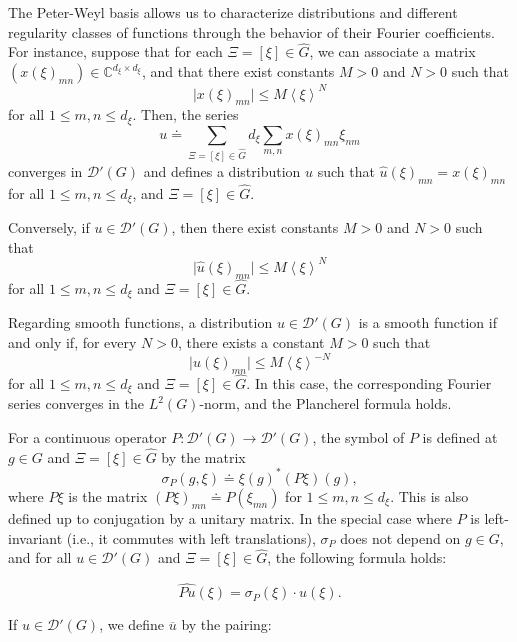 \documentclass[sn-mathphys-num]{sn-jnl}%
\numberwithin{equation}{section}
\theoremstyle{thmstyleone}
\theoremstyle{thmstyletwo}
\theoremstyle{thmstylethree}
\newcommand{\C}{\mathbb{C}}
\def\jp#1{{\left\langle{#1}\right\rangle}}
\begin{document}
The Peter-Weyl basis allows us to characterize distributions and different regularity classes of functions through the behavior of their Fourier coefficients. For instance, suppose that for each $\Xi = [\xi] \in \widehat{G}$, we can associate a matrix $(x(\xi)_{mn}) \in \C^{d_\xi \times d_\xi}$, and that there exist constants $M > 0$ and $N > 0$ such that
\begin{equation}\label{dist}
	\big|x(\xi)_{mn} \big| \leq M \jp{\xi}^{N}
\end{equation}
for all $1 \leq m,n \leq d_\xi$. Then, the series
$$
u \doteq \sum_{\Xi = [\xi] \in \widehat{G}} d_\xi \sum_{m,n} x(\xi)_{mn} \xi_{nm}
$$
converges in $\mathcal{D}'(G)$ and defines a distribution $u$ such that $\widehat{u}(\xi)_{mn} = x(\xi)_{mn}$ for all $1 \leq m,n \leq d_\xi$, and $\Xi = [\xi] \in \widehat{G}$.

Conversely, if $u \in \mathcal{D}'(G)$, then there exist constants $M > 0$ and $N > 0$ such that
$$
\big|\widehat{u}(\xi)_{mn}\big| \leq M \jp{\xi}^{N}
$$
for all $1 \leq m,n \leq d_\xi$ and $\Xi = [\xi] \in \widehat{G}$.

Regarding smooth functions, a distribution $u \in \mathcal{D}'(G)$ is a smooth function if and only if, for every $N > 0$, there exists a constant $M > 0$ such that
\begin{equation}\label{smooth1}
	\big|\widehat{u}(\xi)_{mn} \big| \leq M \jp{\xi}^{-N}
\end{equation}
for all $1 \leq m,n \leq d_\xi$ and $\Xi = [\xi] \in \widehat{G}$. In this case, the corresponding Fourier series converges in the $L^2(G)$-norm, and the Plancherel formula holds.

For a continuous operator $P: \mathcal{D}'(G) \to \mathcal{D}'(G)$, the symbol of $P$ is defined at $g \in G$ and $\Xi = [\xi] \in \widehat{G}$ by the matrix
$$
\sigma_P(g,\xi) \doteq \xi(g)^\ast (P\xi)(g),
$$
where $P\xi$ is the matrix $(P\xi)_{mn} \doteq P(\xi_{mn})$ for $1 \leq m,n \leq d_\xi$. This is also defined up to conjugation by a unitary matrix. In the special case where $P$ is left-invariant (i.e., it commutes with left translations), $\sigma_P$ does not depend on $g \in G$, and for all $u \in \mathcal{D}'(G)$ and $\Xi = [\xi] \in \widehat{G}$, the following formula holds:

\begin{equation} \label{multiply}
\widehat{Pu}(\xi) = \sigma_P(\xi)\cdot \widehat{u}(\xi).
\end{equation} 

If $u \in \mathcal{D}'(G)$, we define $\overline{u}$ by the pairing:
\end{document}
